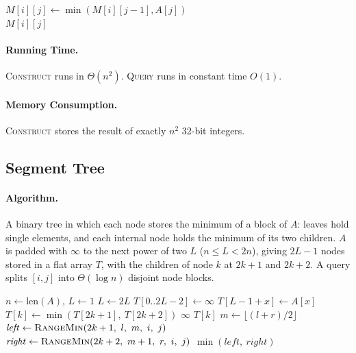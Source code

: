 \documentclass{article}
\theoremstyle{definition}
\begin{document}
\begin{algorithm}[H]
\caption{Linear Search}
\label{alg:block}
\begin{algorithmic}[H]
            \State $M[i][j] \gets \min(M[i][j-1], A[j])$
        \EndFor
    \EndFor
\EndFunction
\\
    \State \Return $M[i][j]$
\EndFunction
\end{algorithmic}
\end{algorithm}

\paragraph{Running Time.}
\textsc{Construct} runs in $\Theta(n^2)$.
\textsc{Query} runs in constant time $O(1)$.

\paragraph{Memory Consumption.}
\textsc{Construct} stores the result of exactly $n^2$ 32-bit integers.

\subsection{Segment Tree}
\paragraph{Algorithm.}
A binary tree in which each node stores the minimum of a block of $A$: leaves hold single elements, and each internal node holds the minimum of its two children. $A$ is padded with $\infty$ to the next power of two $L$ ($n \leq L < 2n$), giving $2L - 1$ nodes stored in a flat array $T$, with the children of node $k$ at $2k + 1$ and $2k + 2$. A query splits $[i, j]$ into $\Theta(\log{n})$
disjoint node blocks.

\begin{algorithm}[H]
\caption{Segment Tree}
\begin{algorithmic}[H]
  \State $n \gets \mathrm{len}(A)$, \quad $L \gets 1$
    \State $L \gets 2L$
  \EndWhile
  \State $T[0..2L-2] \gets \infty$
    \State $T[L - 1 + x] \gets A[x]$
  \EndFor
    \State $T[k] \gets \min(T[2k+1],\ T[2k+2])$
  \EndFor
\EndFunction
{}
  \State \Return {}
\EndFunction
{}
    \State \Return $\infty$ 
  \EndIf
    \State \Return $T[k]$ 
  \EndIf
  \State $m \gets \lfloor (l + r) / 2 \rfloor$
  \State $\mathit{left} \gets \Call{RangeMin}{2k+1,\ l,\ m,\ i,\ j}$
  \State $\mathit{right} \gets \Call{RangeMin}{2k+2,\ m+1,\ r,\ i,\ j}$
  \State \Return $\min(\mathit{left},\ \mathit{right})$
\EndFunction
\end{algorithmic}
\end{algorithm}
 
\end{document}
